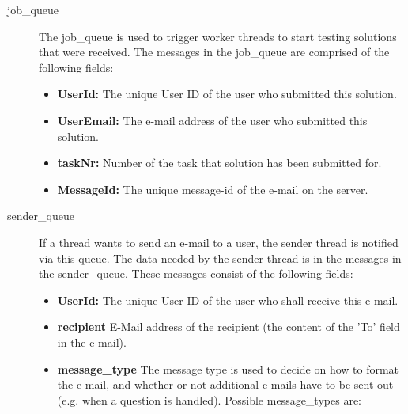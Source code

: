 \begin{description}
\item [job\_queue] The job\_queue is used to trigger worker threads to start testing solutions 
    that were received. The messages in the job\_queue are comprised of the following fields:
    \begin{itemize}
        \item {\bf UserId:} The unique User ID of the user who submitted this solution.
        \item {\bf UserEmail:} The e-mail address of the user who submitted this solution.
        \item {\bf taskNr:} Number of the task that solution has been submitted for.
        \item {\bf MessageId:} The unique message-id of the e-mail on the server.
    \end{itemize}
\item [sender\_queue] If a thread wants to send an e-mail to a user, the sender thread is notified via this queue. 
    The data needed by the sender thread is in the messages in the sender\_queue. These messages consist of the following fields:
    \begin{itemize}
        \item {\bf UserId:} The unique User ID of the user who shall receive this e-mail.
        \item {\bf recipient} E-Mail address of the recipient (the content of the 'To' field in the e-mail).
        \item {\bf message\_type} The message type is used to decide on how to format the e-mail, and 
            whether or not additional e-mails have to be sent out (e.g. when a question is handled). 
            Possible message\_types are:


\end{itemize}
\end{description}
